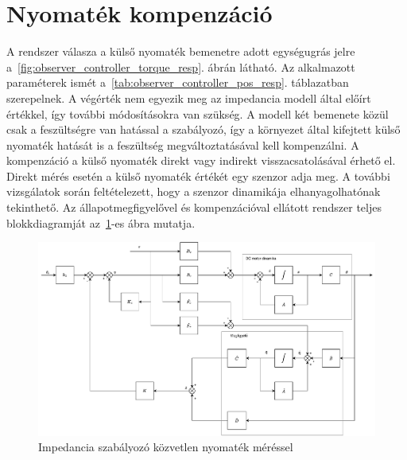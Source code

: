 \section{Nyomaték kompenzáció}
A rendszer válasza a külső nyomaték bemenetre adott egységugrás jelre a~\ref{fig:observer_controller_torque_resp}. ábrán látható. 
Az alkalmazott paraméterek ismét a~\ref{tab:observer_controller_pos_resp}. táblazatban szerepelnek.
A végérték nem egyezik meg az impedancia modell által előírt értékkel, így további módosításokra van szükség.
A modell két bemenete közül csak a feszültségre van hatással a 
szabályozó, így a környezet által kifejtett külső nyomaték 
hatását is a feszültség megváltoztatásával kell kompenzálni. A kompenzáció
a külső nyomaték direkt vagy indirekt visszacsatolásával érhető el.
Direkt mérés esetén a külső nyomaték értékét egy szenzor adja meg.
A további vizsgálatok során feltételezett, hogy a szenzor dinamikája elhanyagolhatónak tekinthető. Az
állapotmegfigyelővel és kompenzációval ellátott rendszer teljes 
blokkdiagramját az~\ref{fig:block_diagram_direct_compensation}-es ábra mutatja.
\begin{figure}[ht]
    \begin{center}
    \includegraphics[width=\textwidth]{images/compensated_position_control_torque.pdf}
    \caption{Impedancia szabályozó közvetlen nyomaték méréssel}\label{fig:block_diagram_direct_compensation}
    \end{center}
\end{figure}

